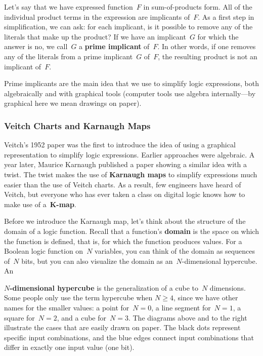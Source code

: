 Let's say that we have expressed function~$F$ in sum-of-products 
form.
All of the individual product terms in the expression are implicants of~$F$.  
%
As a first step in simplification, we can ask: for each implicant, is it
possible to remove any of the literals that make up the product?
%
If we have an implicant~$G$ for which the answer is no, we 
call~$G$ a {\bf prime implicant} of~$F$.
%
In other words, if one removes any of the literals from a prime 
implicant~$G$ of~$F$,
the resulting product is not an implicant of~$F$.

Prime implicants are the main idea that we use to simplify logic expressions,
both algebraically and with graphical tools (computer tools use algebra
internally---by graphical here we mean drawings on paper).\\


\subsubsection{Veitch Charts and Karnaugh Maps}

Veitch's 1952 paper was the first to introduce the idea of
using a graphical representation to simplify logic expressions.
Earlier approaches were algebraic.
A year later, Maurice Karnaugh published
a paper showing a similar idea with a twist.  The twist makes the use of 
{\bf Karnaugh maps} to simplify expressions
much easier than the use of Veitch charts.  As a result,
few engineers have heard of Veitch, but everyone who has ever
taken a class on digital logic knows how to make use of a~\mbox{\bf K-map}. 


\begin{minipage}{2.85in}
Before we introduce the Karnaugh map, let's think about the structure
of the domain of a logic function.  Recall that a function's {\bf domain}
is the space on which the function is defined, that is, for which the
function produces values.  For a Boolean logic function on~$N$ variables,
you can think of the domain as sequences of~$N$ bits, but you can also
visualize the domain as an~\mbox{$N$-dimensional} hypercube.  
An\linebreak
\end{minipage}\hspace{0.25in}%
\begin{minipage}{3.4in}
\end{minipage}\mpdone

{\bf \mbox{$N$-dimensional} hypercube} is the generalization
of a cube to~$N$ dimensions.  Some people only use the term hypercube when
$N\geq{4}$, since we have other names for the smaller values: a point
for~$N=0$, a line segment for~$N=1$, a square for~$N=2$, and a cube
for~$N=3$.  The diagrams above and to the right illustrate the cases that 
are easily drawn on paper.  The black dots represent specific input
combinations, and the blue edges connect input combinations that differ
in exactly one input value (one bit).


